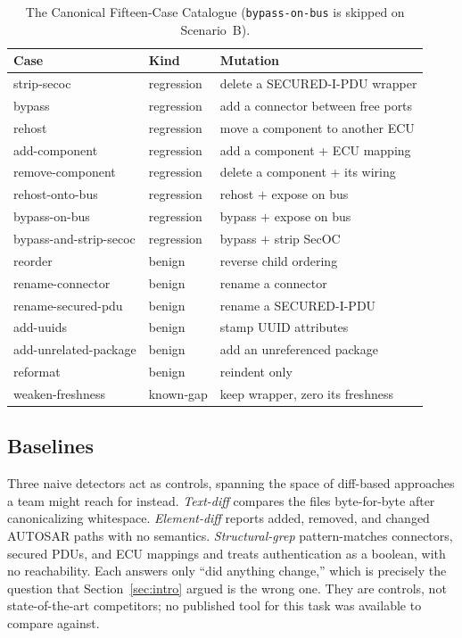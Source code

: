 \documentclass[journal]{IEEEtran}
\begin{document}
\begin{table}[t]
\centering
\caption{The Canonical Fifteen-Case Catalogue (\texttt{bypass-on-bus} is skipped on Scenario~B).}
\label{tab:corpus}
\renewcommand{\arraystretch}{1.12}
\begin{tabular}{@{}p{2.7cm}p{1.3cm}p{3.1cm}@{}}
\toprule
\textbf{Case} & \textbf{Kind} & \textbf{Mutation} \\
\midrule
strip-secoc            & regression & delete a SECURED-I-PDU wrapper \\
bypass                 & regression & add a connector between free ports \\
rehost                 & regression & move a component to another ECU \\
add-component          & regression & add a component + ECU mapping \\
remove-component       & regression & delete a component + its wiring \\
rehost-onto-bus        & regression & rehost $+$ expose on bus \\
bypass-on-bus          & regression & bypass $+$ expose on bus \\
bypass-and-strip-secoc & regression & bypass $+$ strip SecOC \\
reorder                & benign     & reverse child ordering \\
rename-connector       & benign     & rename a connector \\
rename-secured-pdu     & benign     & rename a SECURED-I-PDU \\
add-uuids              & benign     & stamp UUID attributes \\
add-unrelated-package  & benign     & add an unreferenced package \\
reformat               & benign     & reindent only \\
weaken-freshness       & known-gap  & keep wrapper, zero its freshness \\
\bottomrule
\end{tabular}
\end{table}

\subsection{Baselines}
Three naive detectors act as controls, spanning the space of diff-based
approaches a team might reach for instead. \emph{Text-diff} compares the files
byte-for-byte after canonicalizing whitespace. \emph{Element-diff} reports
added, removed, and changed AUTOSAR paths with no semantics.
\emph{Structural-grep} pattern-matches connectors, secured PDUs, and ECU
mappings and treats authentication as a boolean, with no reachability. Each
answers only ``did anything change,'' which is precisely the question that
Section~\ref{sec:intro} argued is the wrong one. They are controls, not
state-of-the-art competitors; no published tool for this task was available to
compare against.
\end{document}
